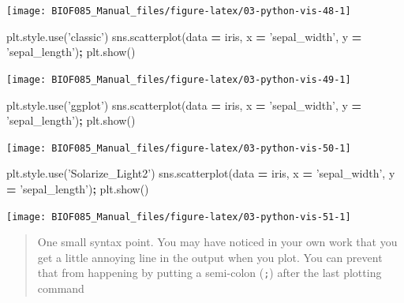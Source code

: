 \documentclass[
  letterpaper,
]{scrbook}
\newenvironment{Shaded}{\begin{snugshade}}{\end{snugshade}}
\newcommand{\NormalTok}[1]{#1}
\newcommand{\OperatorTok}[1]{\textcolor[rgb]{0.81,0.36,0.00}{\textbf{#1}}}
\newcommand{\StringTok}[1]{\textcolor[rgb]{0.31,0.60,0.02}{#1}}
\begin{document}
\begin{center}\texttt{[image: BIOF085\_Manual\_files/figure-latex/03-python-vis-48-1]} \end{center}

\begin{Shaded}
\begin{Highlighting}[]
\NormalTok{plt.style.use(}\StringTok{'classic'}\NormalTok{)}
\NormalTok{sns.scatterplot(data }\OperatorTok{=}\NormalTok{ iris, x }\OperatorTok{=} \StringTok{'sepal_width'}\NormalTok{, y }\OperatorTok{=} \StringTok{'sepal_length'}\NormalTok{)}\OperatorTok{;}
\NormalTok{plt.show()}
\end{Highlighting}
\end{Shaded}

\begin{center}\texttt{[image: BIOF085\_Manual\_files/figure-latex/03-python-vis-49-1]} \end{center}

\begin{Shaded}
\begin{Highlighting}[]
\NormalTok{plt.style.use(}\StringTok{'ggplot'}\NormalTok{)}
\NormalTok{sns.scatterplot(data }\OperatorTok{=}\NormalTok{ iris, x }\OperatorTok{=} \StringTok{'sepal_width'}\NormalTok{, y }\OperatorTok{=} \StringTok{'sepal_length'}\NormalTok{)}\OperatorTok{;}
\NormalTok{plt.show()}
\end{Highlighting}
\end{Shaded}

\begin{center}\texttt{[image: BIOF085\_Manual\_files/figure-latex/03-python-vis-50-1]} \end{center}

\begin{Shaded}
\begin{Highlighting}[]
\NormalTok{plt.style.use(}\StringTok{'Solarize_Light2'}\NormalTok{)}
\NormalTok{sns.scatterplot(data }\OperatorTok{=}\NormalTok{ iris, x }\OperatorTok{=} \StringTok{'sepal_width'}\NormalTok{, y }\OperatorTok{=} \StringTok{'sepal_length'}\NormalTok{)}\OperatorTok{;}
\NormalTok{plt.show()}
\end{Highlighting}
\end{Shaded}

\begin{center}\texttt{[image: BIOF085\_Manual\_files/figure-latex/03-python-vis-51-1]} \end{center}

\begin{quote}
One small syntax point. You may have noticed in your own work that you get a little annoying line in the output when you plot. You can prevent that from happening by putting a semi-colon (\texttt{;}) after the last plotting command
\end{quote}
\end{document}
